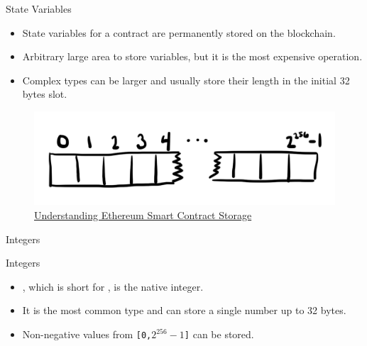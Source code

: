 \documentclass[handout]{beamer}
\begin{document}
\begin{frame}{State Variables}

	\begin{itemize}
		\item State variables for a contract are permanently stored on the blockchain.
		\item Arbitrary large area to store variables, but it is the most expensive operation.
		\item Complex types can be larger and usually store their length in the initial 32 bytes slot.
	\end{itemize}
	
	\begin{figure}
		\includegraphics[scale=0.2]{../assets/images/sc_storage}
\caption{\link \href{https://programtheblockchain.com/posts/2018/03/09/understanding-ethereum-smart-contract-storage/}{Understanding Ethereum Smart Contract Storage}}
		\label{fig:sc_storage}
	\end{figure}

\end{frame}

\begin{frame}{Integers}

	\begin{samplecode}{Integers}
		
	\end{samplecode}
	\begin{itemize}
		\item<2->{, which is short for , is the native integer.}
		\item<3->{It is the most common type and can store a single number up to 32 bytes.}
		\item<4->{Non-negative values from \texttt{[0,$2^{256}-1$]} can be stored.}
	\end{itemize}

\end{frame}
\end{document}
